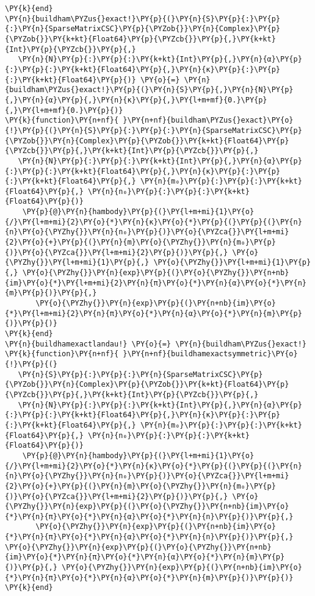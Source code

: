 \begin{Verbatim}[commandchars=\\\{\}]
\PY{k}{end}
\PY{n}{buildham\PYZus{}exact!}\PY{p}{(}\PY{n}{S}\PY{p}{:}\PY{p}{:}\PY{n}{SparseMatrixCSC}\PY{p}{\PYZob{}}\PY{n}{Complex}\PY{p}{\PYZob{}}\PY{k+kt}{Float64}\PY{p}{\PYZcb{}}\PY{p}{,}\PY{k+kt}{Int}\PY{p}{\PYZcb{}}\PY{p}{,}
   \PY{n}{N}\PY{p}{:}\PY{p}{:}\PY{k+kt}{Int}\PY{p}{,}\PY{n}{α}\PY{p}{:}\PY{p}{:}\PY{k+kt}{Float64}\PY{p}{,}\PY{n}{κ}\PY{p}{:}\PY{p}{:}\PY{k+kt}{Float64}\PY{p}{)} \PY{o}{=} \PY{n}{buildham\PYZus{}exact!}\PY{p}{(}\PY{n}{S}\PY{p}{,}\PY{n}{N}\PY{p}{,}\PY{n}{α}\PY{p}{,}\PY{n}{κ}\PY{p}{,}\PY{l+m+mf}{0.}\PY{p}{,}\PY{l+m+mf}{0.}\PY{p}{)}
\PY{k}{function}\PY{n+nf}{ }\PY{n+nf}{buildham\PYZus{}exact}\PY{o}{!}\PY{p}{(}\PY{n}{S}\PY{p}{:}\PY{p}{:}\PY{n}{SparseMatrixCSC}\PY{p}{\PYZob{}}\PY{n}{Complex}\PY{p}{\PYZob{}}\PY{k+kt}{Float64}\PY{p}{\PYZcb{}}\PY{p}{,}\PY{k+kt}{Int}\PY{p}{\PYZcb{}}\PY{p}{,}
   \PY{n}{N}\PY{p}{:}\PY{p}{:}\PY{k+kt}{Int}\PY{p}{,}\PY{n}{α}\PY{p}{:}\PY{p}{:}\PY{k+kt}{Float64}\PY{p}{,}\PY{n}{κ}\PY{p}{:}\PY{p}{:}\PY{k+kt}{Float64}\PY{p}{,} \PY{n}{m₀}\PY{p}{:}\PY{p}{:}\PY{k+kt}{Float64}\PY{p}{,} \PY{n}{n₀}\PY{p}{:}\PY{p}{:}\PY{k+kt}{Float64}\PY{p}{)}
    \PY{p}{@}\PY{n}{hambody}\PY{p}{(}\PY{l+m+mi}{1}\PY{o}{/}\PY{l+m+mi}{2}\PY{o}{*}\PY{n}{κ}\PY{o}{*}\PY{p}{(}\PY{p}{(}\PY{n}{n}\PY{o}{\PYZhy{}}\PY{n}{n₀}\PY{p}{)}\PY{o}{\PYZca{}}\PY{l+m+mi}{2}\PY{o}{+}\PY{p}{(}\PY{n}{m}\PY{o}{\PYZhy{}}\PY{n}{m₀}\PY{p}{)}\PY{o}{\PYZca{}}\PY{l+m+mi}{2}\PY{p}{)}\PY{p}{,} \PY{o}{\PYZhy{}}\PY{l+m+mi}{1}\PY{p}{,} \PY{o}{\PYZhy{}}\PY{l+m+mi}{1}\PY{p}{,} \PY{o}{\PYZhy{}}\PY{n}{exp}\PY{p}{(}\PY{o}{\PYZhy{}}\PY{n+nb}{im}\PY{o}{*}\PY{l+m+mi}{2}\PY{n}{π}\PY{o}{*}\PY{n}{α}\PY{o}{*}\PY{n}{m}\PY{p}{)}\PY{p}{,}
       \PY{o}{\PYZhy{}}\PY{n}{exp}\PY{p}{(}\PY{n+nb}{im}\PY{o}{*}\PY{l+m+mi}{2}\PY{n}{π}\PY{o}{*}\PY{n}{α}\PY{o}{*}\PY{n}{m}\PY{p}{)}\PY{p}{)}
\PY{k}{end}
\PY{n}{buildhamexactlandau!} \PY{o}{=} \PY{n}{buildham\PYZus{}exact!}
\PY{k}{function}\PY{n+nf}{ }\PY{n+nf}{buildhamexactsymmetric}\PY{o}{!}\PY{p}{(}
   \PY{n}{S}\PY{p}{:}\PY{p}{:}\PY{n}{SparseMatrixCSC}\PY{p}{\PYZob{}}\PY{n}{Complex}\PY{p}{\PYZob{}}\PY{k+kt}{Float64}\PY{p}{\PYZcb{}}\PY{p}{,}\PY{k+kt}{Int}\PY{p}{\PYZcb{}}\PY{p}{,}
   \PY{n}{N}\PY{p}{:}\PY{p}{:}\PY{k+kt}{Int}\PY{p}{,}\PY{n}{α}\PY{p}{:}\PY{p}{:}\PY{k+kt}{Float64}\PY{p}{,}\PY{n}{κ}\PY{p}{:}\PY{p}{:}\PY{k+kt}{Float64}\PY{p}{,} \PY{n}{m₀}\PY{p}{:}\PY{p}{:}\PY{k+kt}{Float64}\PY{p}{,} \PY{n}{n₀}\PY{p}{:}\PY{p}{:}\PY{k+kt}{Float64}\PY{p}{)}
    \PY{p}{@}\PY{n}{hambody}\PY{p}{(}\PY{l+m+mi}{1}\PY{o}{/}\PY{l+m+mi}{2}\PY{o}{*}\PY{n}{κ}\PY{o}{*}\PY{p}{(}\PY{p}{(}\PY{n}{n}\PY{o}{\PYZhy{}}\PY{n}{n₀}\PY{p}{)}\PY{o}{\PYZca{}}\PY{l+m+mi}{2}\PY{o}{+}\PY{p}{(}\PY{n}{m}\PY{o}{\PYZhy{}}\PY{n}{m₀}\PY{p}{)}\PY{o}{\PYZca{}}\PY{l+m+mi}{2}\PY{p}{)}\PY{p}{,} \PY{o}{\PYZhy{}}\PY{n}{exp}\PY{p}{(}\PY{o}{\PYZhy{}}\PY{n+nb}{im}\PY{o}{*}\PY{n}{π}\PY{o}{*}\PY{n}{α}\PY{o}{*}\PY{n}{n}\PY{p}{)}\PY{p}{,}
       \PY{o}{\PYZhy{}}\PY{n}{exp}\PY{p}{(}\PY{n+nb}{im}\PY{o}{*}\PY{n}{π}\PY{o}{*}\PY{n}{α}\PY{o}{*}\PY{n}{n}\PY{p}{)}\PY{p}{,} \PY{o}{\PYZhy{}}\PY{n}{exp}\PY{p}{(}\PY{o}{\PYZhy{}}\PY{n+nb}{im}\PY{o}{*}\PY{n}{π}\PY{o}{*}\PY{n}{α}\PY{o}{*}\PY{n}{m}\PY{p}{)}\PY{p}{,} \PY{o}{\PYZhy{}}\PY{n}{exp}\PY{p}{(}\PY{n+nb}{im}\PY{o}{*}\PY{n}{π}\PY{o}{*}\PY{n}{α}\PY{o}{*}\PY{n}{m}\PY{p}{)}\PY{p}{)}
\PY{k}{end}


\end{Verbatim}
